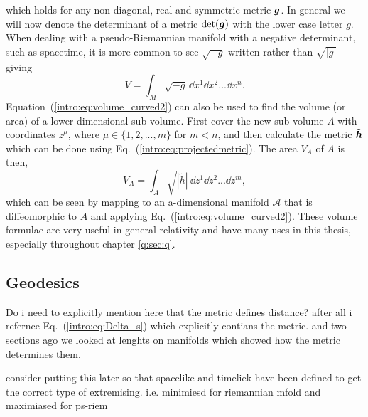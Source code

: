 which holds for any non-diagonal, real and symmetric metric $\boldsymbol{g}$. In general we will now denote the determinant of a metric $\det(\boldsymbol{g})$ with the lower case letter $g$. When dealing with a pseudo-Riemannian manifold with a negative determinant, such as spacetime, it is more common to see $\sqrt{-g}$ written rather than $\sqrt{|g|}$ giving
\begin{equation}
V = \int_{M}\sqrt{-g} \,\dd {x}^1 \dd {x}^2 ... \dd {x}^n.
\end{equation}
Equation~(\ref{intro:eq:volume_curved2}) can also be used to find the volume (or area) of a lower dimensional sub-volume. First cover the new sub-volume $A$ with coordinates $z^\mu$, where $\mu\in\{1,2,...,m\}$ for $m<n$, and then calculate the metric $\tilde{\boldsymbol{h}}$ which can be done using Eq.~(\ref{intro:eq:projectedmetric}). The area $V_A$ of $A$ is then,
\begin{equation} \label{intro:eq:area_int}
V_A = \int_{A}\sqrt{|\tilde{h}|} \,\dd {z}^1 \dd {z}^2 ... \dd {z}^m,
\end{equation}
which can be seen by mapping to an a-dimensional manifold $\mathcal{A}$ that is diffeomorphic to $A$ and applying Eq.~(\ref{intro:eq:volume_curved2}). These volume formulae are very useful in general relativity and have many uses in this thesis, especially throughout chapter \ref{q:sec:q}.


 \subsection{Geodesics} \label{intro:sec:geodesics}

\color{choral} Do i need to explicitly mention here that the metric defines distance? after all i refernce Eq.~(\ref{intro:eq:Delta_s}) which explicitly contians the metric. and two sections ago we looked at lenghts on manifolds which showed how the metric determines them. \color{black}

\color{gren} consider putting this later so that spacelike and timeliek have been defined to get the correct type of extremising. i.e. minimiesd for riemannian mfold and maximiased for ps-riem \color{black}

